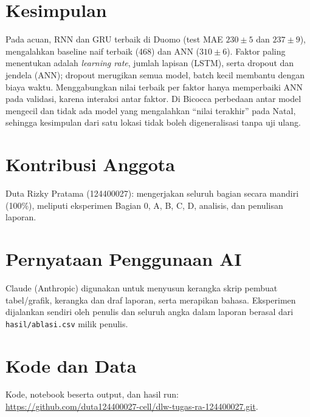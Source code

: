\documentclass[conference,a4paper]{IEEEtran}
\begin{document}
\section{Kesimpulan}
Pada acuan, RNN dan GRU terbaik di Duomo (test MAE $230\pm5$ dan $237\pm9$), mengalahkan baseline naif terbaik (468) dan ANN ($310\pm6$). Faktor paling menentukan adalah \textit{learning rate}, jumlah lapisan (LSTM), serta dropout dan jendela (ANN); dropout merugikan semua model, batch kecil membantu dengan biaya waktu. Menggabungkan nilai terbaik per faktor hanya memperbaiki ANN pada validasi, karena interaksi antar faktor. Di Bicocca perbedaan antar model mengecil dan tidak ada model yang mengalahkan ``nilai terakhir'' pada Natal, sehingga kesimpulan dari satu lokasi tidak boleh digeneralisasi tanpa uji ulang.

\section*{Kontribusi Anggota}
Duta Rizky Pratama (124400027): mengerjakan seluruh bagian secara mandiri (100\%), meliputi eksperimen Bagian 0, A, B, C, D, analisis, dan penulisan laporan.

\section*{Pernyataan Penggunaan AI}
Claude (Anthropic) digunakan untuk menyusun kerangka skrip pembuat tabel/grafik, kerangka dan draf laporan, serta merapikan bahasa. Eksperimen dijalankan sendiri oleh penulis dan seluruh angka dalam laporan berasal dari \texttt{hasil/ablasi.csv} milik penulis.

\section*{Kode dan Data}
Kode, notebook beserta output, dan hasil run: \url{https://github.com/duta124400027-cell/dlw-tugas-ra-124400027.git}.



\end{document}
